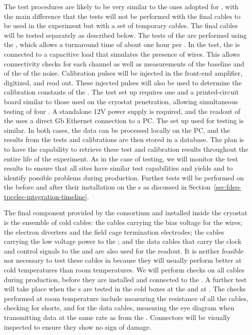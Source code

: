 The test procedures are likely to be
very similar to the ones adopted for , with the main
difference that the tests will not be performed with
the final cables to be used in the experiment but 
with a set of temporary cables. The final cables will be tested
separately as described below. The tests of the 
are performed using the , which allows a turnaround
time of about one hour per . In the
test, the  is connected to a capacitive load that
simulates the presence of  wires. This allows
connectivity checks for each channel as well as measurements of
the baseline and of the \rms of the noise. Calibration 
pulses will be injected in the front-end amplifier, digitized,
and read out. These injected pulses will also be used
to determine the calibration constants of the . 
The test set up requires one  and
a printed-circuit board similar to those used on the cryostat
penetration, allowing simultaneous testing of four .
A standalone 12V power supply is required, and the readout
of the  uses a direct Gb Ethernet connection to
a PC. The set up used for  testing is similar.
In both cases, the data can be processed locally on the PC,
and the results from the tests and calibrations are then stored 
in a database. The plan is to have the capability to retrieve  
these test and calibration results throughout the entire life
of the experiment. As in the case of  testing,
we will monitor the test results to ensure that all
sites have similar test capabilities and yields and to
identify possible problems during production.
Further tests will be performed on the 
before and after their installation on the s as
discussed in Section~\ref{sec:fdsp-tpcelec-integration-timeline}.

The final component provided by the  consortium
and installed inside the cryostat is the ensemble of cold
cables: the cables carrying the bias voltage for the 
wires; the electron diverters and the field cage termination electrodes;
the cables carrying the low voltage power to the ;
and the data cables that carry the clock and control signals
to the  and are also used for the readout. It is neither
feasible nor necessary to test these cables in \lntwo
because they will usually perform better at cold temperatures than 
room temperatures. We will perform checks on all cables 
during production, before they are installed and 
connected to the . A further test will take place
when the s are tested in the cold boxes at the 
and at . The checks performed at room temperature include
measuring the resistance of all the cables, checking for
shorts, and for the data cables, measuring the
eye diagram when transmitting data at the same rate as from the
. Connectors will be visually inspected 
to ensure they show no sign of damage.

